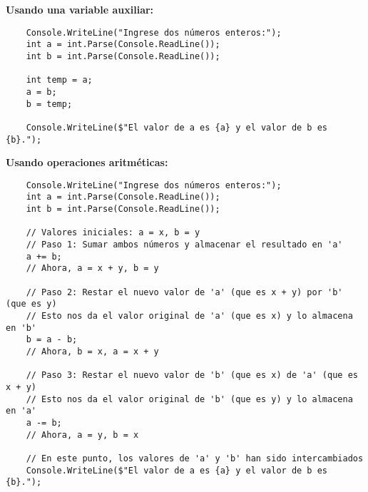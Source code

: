 \textbf{Usando una variable auxiliar:}
\begin{lstlisting}
    Console.WriteLine("Ingrese dos números enteros:");
    int a = int.Parse(Console.ReadLine());
    int b = int.Parse(Console.ReadLine());
    
    int temp = a;
    a = b;
    b = temp;
    
    Console.WriteLine($"El valor de a es {a} y el valor de b es {b}.");
\end{lstlisting}

\textbf{Usando operaciones aritméticas:}
\begin{lstlisting}
    Console.WriteLine("Ingrese dos números enteros:");
    int a = int.Parse(Console.ReadLine());
    int b = int.Parse(Console.ReadLine());
    
    // Valores iniciales: a = x, b = y
    // Paso 1: Sumar ambos números y almacenar el resultado en 'a'
    a += b;
    // Ahora, a = x + y, b = y
    
    // Paso 2: Restar el nuevo valor de 'a' (que es x + y) por 'b' (que es y)
    // Esto nos da el valor original de 'a' (que es x) y lo almacena en 'b'
    b = a - b;
    // Ahora, b = x, a = x + y
    
    // Paso 3: Restar el nuevo valor de 'b' (que es x) de 'a' (que es x + y)
    // Esto nos da el valor original de 'b' (que es y) y lo almacena en 'a'
    a -= b;
    // Ahora, a = y, b = x
    
    // En este punto, los valores de 'a' y 'b' han sido intercambiados
    Console.WriteLine($"El valor de a es {a} y el valor de b es {b}.");
\end{lstlisting}